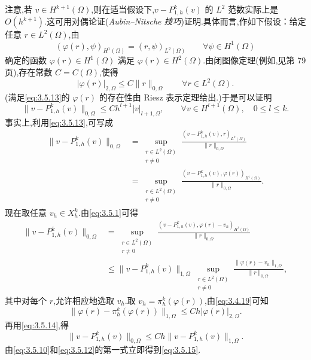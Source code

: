 注意,若 \(v\in H^{k+1}(\Omega)\),则在适当假设下,\(v-P_{1,h}^k(v)\) 的 \(L^2\) 范数实际上是 \(O(h^{k+1})\).这可用对偶论证(\emph{Aubin--Nitsche 技巧})证明.具体而言,作如下假设：给定任意 \(r\in L^2(\Omega)\),由
\begin{equation}\label{eq:3.5.13}
  (\varphi(r),\psi)_{H^1(\Omega)}=(r,\psi)_{L^2(\Omega)}
  \qquad \forall\psi\in H^1(\Omega)
\end{equation}
确定的函数 \(\varphi(r)\in H^1(\Omega)\) 满足 \(\varphi(r)\in H^2(\Omega)\).由闭图像定理(例如,见第 79 页),存在常数 \(C=C(\Omega)\),使得
\begin{equation}\label{eq:3.5.14}
  |\varphi(r)|_{2,\Omega}\le C\|r\|_{0,\Omega}
  \qquad\forall r\in L^2(\Omega).
\end{equation}
(满足\eqref{eq:3.5.13}的 \(\varphi(r)\) 的存在性由 Riesz 表示定理给出.)于是可以证明
\begin{equation}\label{eq:3.5.15}
  \|v-P_{1,h}^k(v)\|_{0,\Omega}
  \le Ch^{l+1}|v|_{l+1,\Omega},\qquad
  \forall v\in H^{l+1}(\Omega),\quad 0\le l\le k.
\end{equation}
事实上,利用\eqref{eq:3.5.13},可写成
\[
  \begin{aligned}
    \|v-P_{1,h}^k(v)\|_{0,\Omega}
    &=\sup_{\substack{r\in L^2(\Omega)\\r\ne0}}
      \frac{(v-P_{1,h}^k(v),r)_{L^2(\Omega)}}{\|r\|_{0,\Omega}}\\
    &=\sup_{\substack{r\in L^2(\Omega)\\r\ne0}}
      \frac{(v-P_{1,h}^k(v),\varphi(r))_{H^1(\Omega)}}{\|r\|_{0,\Omega}}.
  \end{aligned}
\]
现在取任意 \(v_h\in X_h^k\).由\eqref{eq:3.5.1}可得
\[
  \begin{aligned}
    \|v-P_{1,h}^k(v)\|_{0,\Omega}
    &=\sup_{\substack{r\in L^2(\Omega)\\r\ne0}}
      \frac{(v-P_{1,h}^k(v),\varphi(r)-v_h)_{H^1(\Omega)}}{\|r\|_{0,\Omega}}\\
    &\le\|v-P_{1,h}^k(v)\|_{1,\Omega}
       \sup_{\substack{r\in L^2(\Omega)\\r\ne0}}
       \frac{\|\varphi(r)-v_h\|_{1,\Omega}}{\|r\|_{0,\Omega}},
  \end{aligned}
\]
其中对每个 \(r\),允许相应地选取 \(v_h\).取 \(v_h=\pi_h^k(\varphi(r))\),由\eqref{eq:3.4.19}可知
\[
  \|\varphi(r)-\pi_h^k(\varphi(r))\|_{1,\Omega}
   \le Ch|\varphi(r)|_{2,\Omega}.
\]
再用\eqref{eq:3.5.14},得
\begin{equation}\label{eq:3.5.16}
  \|v-P_{1,h}^k(v)\|_{0,\Omega}\le Ch\|v-P_{1,h}^k(v)\|_{1,\Omega}.
\end{equation}
由\eqref{eq:3.5.10}和\eqref{eq:3.5.12}的第一式立即得到\eqref{eq:3.5.15}.

